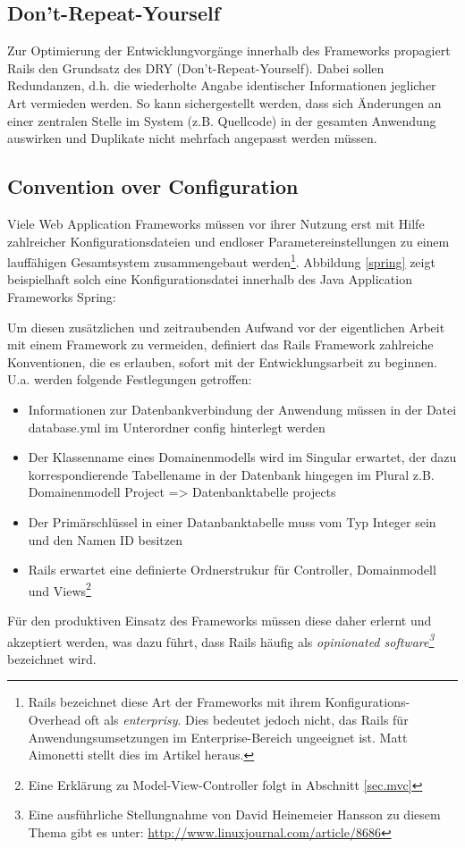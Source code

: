 \subsection{Don't-Repeat-Yourself}
Zur Optimierung der Entwicklungvorgänge innerhalb des Frameworks propagiert Rails den Grundsatz des DRY (Don't-Repeat-Yourself). Dabei sollen Redundanzen, d.h. die wiederholte Angabe identischer Informationen jeglicher Art vermieden werden. So kann sichergestellt werden, dass sich Änderungen an einer zentralen Stelle im System (z.B. Quellcode) in der gesamten Anwendung auswirken und Duplikate nicht mehrfach angepasst werden müssen.
\subsection{Convention over Configuration}
Viele Web Application Frameworks müssen vor ihrer Nutzung erst mit Hilfe zahlreicher Konfigurationsdateien und endloser Parametereinstellungen zu einem lauffähigen Gesamtsystem zusammengebaut werden\footnote{Rails bezeichnet diese Art der Frameworks mit ihrem Konfigurations-Overhead oft als \emph{enterprisy}. Dies bedeutet jedoch nicht, das Rails für Anwendungsumsetzungen im Enterprise-Bereich ungeeignet ist. Matt Aimonetti stellt dies im Artikel \cite{enterprisy} heraus.}. Abbildung \ref{spring} zeigt beispielhaft solch eine Konfigurationsdatei innerhalb des Java Application Frameworks Spring:



Um diesen zusätzlichen und zeitraubenden Aufwand vor der eigentlichen Arbeit mit einem Framework zu vermeiden, definiert das Rails Framework zahlreiche Konventionen, die es erlauben, sofort mit der Entwicklungsarbeit zu beginnen. U.a. werden folgende Festlegungen getroffen:

\begin{itemize}
\item
Informationen zur Datenbankverbindung der Anwendung müssen in der Datei database.yml im Unterordner config hinterlegt werden
\item
Der Klassenname eines Domainenmodells wird im Singular erwartet, der dazu korrespondierende Tabellename in der Datenbank hingegen im Plural z.B. Domainenmodell Project => Datenbanktabelle projects
\item
Der Primärschlüssel in einer Datanbanktabelle muss vom Typ Integer sein und den Namen ID besitzen
\item
Rails erwartet eine definierte Ordnerstrukur für Controller, Domainmodell und Views\footnote{Eine Erklärung zu Model-View-Controller folgt in Abschnitt \ref{sec.mvc}}
\end{itemize}
Für den produktiven Einsatz des Frameworks müssen diese daher erlernt und akzeptiert werden, was dazu führt, dass Rails häufig als \emph{opinionated software\footnote{Eine ausführliche Stellungnahme von David Heinemeier Hansson zu diesem Thema gibt es unter: \href{http://www.linuxjournal.com/article/8686}{http://www.linuxjournal.com/article/8686}}} bezeichnet wird.

